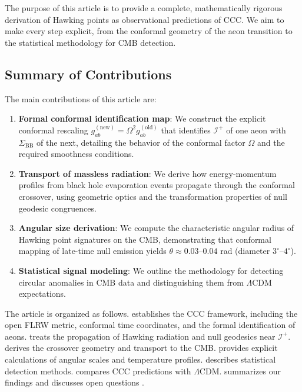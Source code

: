 \documentclass[11pt,a4paper]{article}
\theoremstyle{plain}
\theoremstyle{definition}
\theoremstyle{remark}
\newcommand{\scriplus}{\mathcal{I}^+}
\newcommand{\sigmabb}{\Sigma_{\mathrm{BB}}}
\begin{document}
The purpose of this article is to provide a complete, mathematically rigorous derivation of Hawking points as observational predictions of CCC. We aim to make every step explicit, from the conformal geometry of the aeon transition to the statistical methodology for CMB detection.

\subsection{Summary of Contributions}

The main contributions of this article are:

\begin{enumerate}
    \item[(i)] \textbf{Formal conformal identification map}: We construct the explicit conformal rescaling $g_{ab}^{(\text{new})} = \Omega^2 g_{ab}^{(\text{old})}$ that identifies $\scriplus$ of one aeon with $\sigmabb$ of the next, detailing the behavior of the conformal factor $\Omega$ and the required smoothness conditions.
    
    \item[(ii)] \textbf{Transport of massless radiation}: We derive how energy-momentum profiles from black hole evaporation events propagate through the conformal crossover, using geometric optics and the transformation properties of null geodesic congruences.
    
    \item[(iii)] \textbf{Angular size derivation}: We compute the characteristic angular radius of Hawking point signatures on the CMB, demonstrating that conformal mapping of late-time null emission yields $\theta \approx 0.03$--$0.04$ rad (diameter $3^\circ$--$4^\circ$).
    
    \item[(iv)] \textbf{Statistical signal modeling}: We outline the methodology for detecting circular anomalies in CMB data and distinguishing them from $\Lambda$CDM expectations.
\end{enumerate}

The article is organized as follows.  establishes the CCC framework, including the open FLRW metric, conformal time coordinates, and the formal identification of aeons.  treats the propagation of Hawking radiation and null geodesics near $\scriplus$.  derives the crossover geometry and transport to the CMB.  provides explicit calculations of angular scales and temperature profiles.  describes statistical detection methods.  compares CCC predictions with $\Lambda$CDM.  summarizes our findings and discusses open questions \cite{ccc_wiki,hawking_points_2020,oxford_math}.
\end{document}
